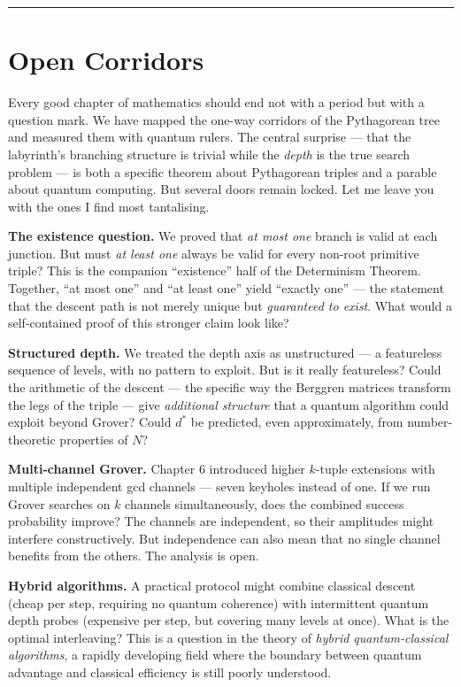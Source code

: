 \bigskip\noindent\rule{\linewidth}{0.4pt}\bigskip

\section{Open Corridors}
Every good chapter of mathematics should end not with a period but with a question mark. We have mapped the one-way corridors of the Pythagorean tree and measured them with quantum rulers. The central surprise --- that the labyrinth's branching structure is trivial while the \emph{depth} is the true search problem --- is both a specific theorem about Pythagorean triples and a parable about quantum computing. But several doors remain locked. Let me leave you with the ones I find most tantalising.

\textbf{The existence question.} We proved that \emph{at most one} branch is valid at each junction. But must \emph{at least one} always be valid for every non-root primitive triple? This is the companion ``existence'' half of the Determinism Theorem. Together, ``at most one'' and ``at least one'' yield ``exactly one'' --- the statement that the descent path is not merely unique but \emph{guaranteed to exist}. What would a self-contained proof of this stronger claim look like?

\textbf{Structured depth.} We treated the depth axis as unstructured --- a featureless sequence of levels, with no pattern to exploit. But is it really featureless? Could the arithmetic of the descent --- the specific way the Berggren matrices transform the legs of the triple --- give \emph{additional structure} that a quantum algorithm could exploit beyond Grover? Could \(d^*\) be predicted, even approximately, from number-theoretic properties of \(N\)?

\textbf{Multi-channel Grover.} Chapter 6 introduced higher \(k\)-tuple extensions with multiple independent gcd channels --- seven keyholes instead of one. If we run Grover searches on \(k\) channels simultaneously, does the combined success probability improve? The channels are independent, so their amplitudes might interfere constructively. But independence can also mean that no single channel benefits from the others. The analysis is open.

\textbf{Hybrid algorithms.} A practical protocol might combine classical descent (cheap per step, requiring no quantum coherence) with intermittent quantum depth probes (expensive per step, but covering many levels at once). What is the optimal interleaving? This is a question in the theory of \emph{hybrid quantum-classical algorithms}, a rapidly developing field where the boundary between quantum advantage and classical efficiency is still poorly understood.

